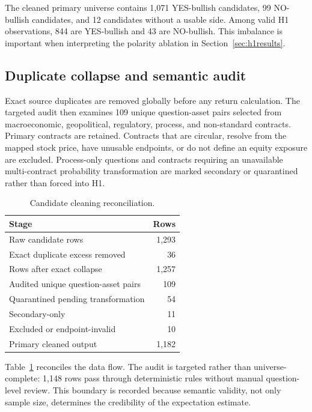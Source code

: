\documentclass[sigconf,anonymous]{acmart}
\begin{document}
The cleaned primary universe contains 1,071 YES-bullish candidates, 99 NO-bullish candidates, and 12 candidates without a usable side. Among valid H1 observations, 844 are YES-bullish and 43 are NO-bullish. This imbalance is important when interpreting the polarity ablation in Section~\ref{sec:h1results}.

\subsection{Duplicate collapse and semantic audit}

Exact source duplicates are removed globally before any return calculation. The targeted audit then examines 109 unique question-asset pairs selected from macroeconomic, geopolitical, regulatory, process, and non-standard contracts. Primary contracts are retained. Contracts that are circular, resolve from the mapped stock price, have unusable endpoints, or do not define an equity exposure are excluded. Process-only questions and contracts requiring an unavailable multi-contract probability transformation are marked secondary or quarantined rather than forced into H1.

\begin{table}[t]
\caption{Candidate cleaning reconciliation.}
\label{tab:cleaning}
\centering
\small
\begin{tabular}{lr}
\toprule
Stage & Rows \\
\midrule
Raw candidate rows & 1,293 \\
Exact duplicate excess removed & 36 \\
Rows after exact collapse & 1,257 \\
Audited unique question-asset pairs & 109 \\
Quarantined pending transformation & 54 \\
Secondary-only & 11 \\
Excluded or endpoint-invalid & 10 \\
Primary cleaned output & 1,182 \\
\bottomrule
\end{tabular}
\end{table}

Table~\ref{tab:cleaning} reconciles the data flow. The audit is targeted rather than universe-complete: 1,148 rows pass through deterministic rules without manual question-level review. This boundary is recorded because semantic validity, not only sample size, determines the credibility of the expectation estimate.
\end{document}

